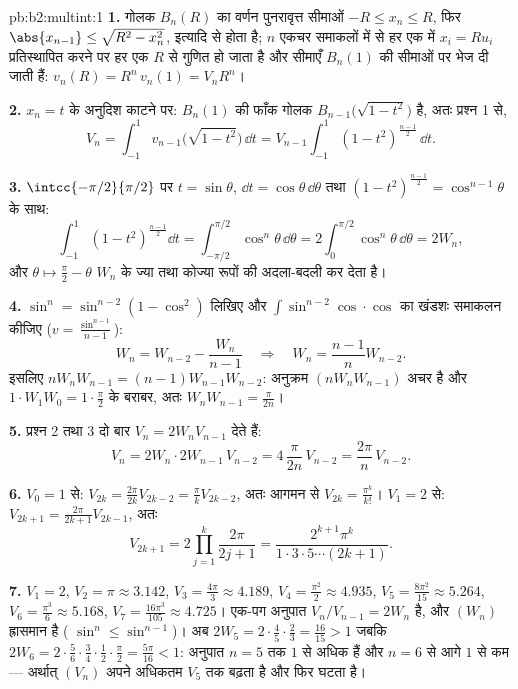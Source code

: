 \begin{solution}{pb:b2:multint:1}
\textbf{1.} गोलक $B_n(R)$ का वर्णन पुनरावृत्त सीमाओं $-R \leq x_n \leq R$, फिर $\abs{x_{n-1}} \leq \sqrt{R^2 -
x_n^2}$,
इत्यादि से होता है; $n$ एकचर समाकलों में से हर एक में $x_i = Ru_i$
प्रतिस्थापित करने पर हर एक $R$ से गुणित हो जाता है और सीमाएँ $B_n(1)$
की सीमाओं पर भेज दी जाती हैं: $v_n(R) = R^n\,v_n(1) =
V_nR^n$।

\textbf{2.} $x_n = t$ के अनुदिश काटने पर: $B_n(1)$ की फाँक गोलक $B_{n-1}\bigl(\sqrt{1 - t^2}\bigr)$ है, अतः
प्रश्न 1 से,
\[
V_n = \int_{-1}^1 v_{n-1}\bigl(\sqrt{1 - t^2}\bigr)\,\dd t
= V_{n-1}\int_{-1}^{1}(1 - t^2)^{\frac{n-1}2}\,\dd t .
\]

\textbf{3.} $\intcc{-\pi/2}{\pi/2}$ पर $t = \sin\theta$, $\dd t =
\cos\theta\,\dd\theta$ तथा $(1 - t^2)^{\frac{n-1}2} =
\cos^{n-1}\theta$ के साथ:
\[
\int_{-1}^1(1 - t^2)^{\frac{n-1}2}\dd t
= \int_{-\pi/2}^{\pi/2}\cos^n\theta\,\dd\theta
= 2\int_0^{\pi/2}\cos^n\theta\,\dd\theta = 2W_n,
\]
और $\theta \mapsto \frac\pi2 - \theta$ $W_n$ के ज्या तथा कोज्या रूपों की अदला-बदली कर देता है।

\textbf{4.} $\sin^n = \sin^{n-2}(1 - \cos^2)$ लिखिए और $\int\sin^{n-2}\cos\cdot\cos$ का खंडशः समाकलन कीजिए ($v =
\frac{\sin^{n-1}}{n-1}$):
\[
W_n = W_{n-2} - \frac{W_n}{n-1}
\quad\Longrightarrow\quad
W_n = \frac{n-1}{n}W_{n-2}.
\]
इसलिए $nW_nW_{n-1} = (n-1)W_{n-1}W_{n-2}$: अनुक्रम $(nW_nW_{n-1})$ अचर है और $1\cdot W_1W_0 =
1\cdot\frac\pi2$ के बराबर, अतः $W_nW_{n-1} = \frac{\pi}{2n}$।

\textbf{5.} प्रश्न 2 तथा 3 दो बार $V_n = 2W_nV_{n-1}$ देते हैं:
\[
V_n = 2W_n\cdot 2W_{n-1}\,V_{n-2}
= 4\,\frac{\pi}{2n}\,V_{n-2} = \frac{2\pi}n\,V_{n-2}.
\]

\textbf{6.} $V_0 = 1$ से: $V_{2k} = \frac{2\pi}{2k}V_{2k-2}
= \frac\pi kV_{2k-2}$, अतः आगमन से $V_{2k} = \frac{\pi^k}{k!}$। $V_1 = 2$ से: $V_{2k+1} =
\frac{2\pi}{2k+1}V_{2k-1}$, अतः
\[
V_{2k+1} = 2\prod_{j=1}^k\frac{2\pi}{2j+1}
= \frac{2^{k+1}\pi^k}{1\cdot3\cdot5\cdots(2k+1)} .
\]

\textbf{7.} $V_1 = 2$, $V_2 = \pi \approx 3.142$, $V_3 =
\frac{4\pi}3 \approx 4.189$, $V_4 = \frac{\pi^2}2 \approx
4.935$, $V_5 = \frac{8\pi^2}{15} \approx 5.264$, $V_6 =
\frac{\pi^3}6 \approx 5.168$, $V_7 = \frac{16\pi^3}{105}
\approx 4.725$। एक-पग अनुपात $V_n/V_{n-1} = 2W_n$
है, और $(W_n)$ ह्रासमान है ( $\sin^n \leq \sin^{n-1}$)। अब $2W_5 = 2\cdot\frac45\cdot\frac23 =
\frac{16}{15} > 1$ जबकि $2W_6 =
2\cdot\frac56\cdot\frac34\cdot\frac12\cdot\frac\pi2 =
\frac{5\pi}{16} < 1$:
अनुपात $n = 5$ तक $1$ से अधिक हैं और $n = 6$ से आगे $1$ से कम ---
अर्थात् $(V_n)$ अपने अधिकतम $V_5$ तक बढ़ता है और फिर घटता है।


\end{solution}
